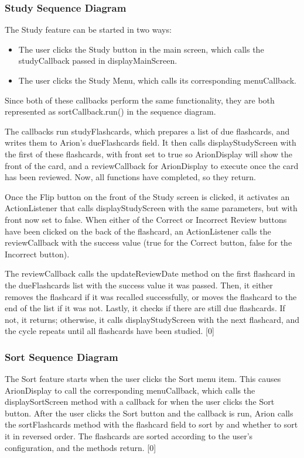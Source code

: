 \documentclass{scrreprt}
\begin{document}
\subsubsection*{Study Sequence Diagram}
\noindent
The Study feature can be started in two ways:
\begin{itemize}
    \item The user clicks the Study button in the main screen, which calls the studyCallback passed in displayMainScreen.
    \item The user clicks the Study Menu, which calls its corresponding menuCallback.
\end{itemize}
Since both of these callbacks perform the same functionality,
    they are both represented as sortCallback.run() in the sequence diagram.
    
The callbacks run studyFlashcards, which prepares a list of due flashcards, and writes them to Arion's dueFlashcards field.
It then calls displayStudyScreen with the first of these flashcards, with
    front set to true so ArionDisplay will show the front of the card, 
    and a reviewCallback for ArionDisplay to execute once the card has been reviewed.
Now, all functions have completed, so they return.

Once the Flip button on the front of the Study screen is clicked,
it activates an ActionListener that calls displayStudyScreen with the same parameters, but with front now set to false.
When either of the Correct or Incorrect Review buttons have been clicked on the back of the flashcard,
    an ActionListener calls the reviewCallback with the success value (true for the Correct button, false for the Incorrect button).
    
The reviewCallback calls the updateReviewDate method on the first flashcard in the dueFlashcards list with the success value it was passed.
Then, it either removes the flashcard if it was recalled successfully, or moves the flashcard to the end of the list if it was not.
Lastly, it checks if there are still due flashcards.
If not, it returns; otherwise, it calls displayStudyScreen with the next flashcard, and the cycle repeats until all flashcards have been studied.
[0]

\subsubsection*{Sort Sequence Diagram}
The Sort feature starts when the user clicks the Sort menu item.
This causes ArionDisplay to call the corresponding menuCallback,
    which calls the displaySortScreen method with a callback for when the user clicks the Sort button.
After the user clicks the Sort button and the callback is run,
    Arion calls the sortFlashcards method with the flashcard field to sort by and whether to sort it in reversed order.
The flashcards are sorted according to the user's configuration, and the methods return.
[0]
\end{document}
